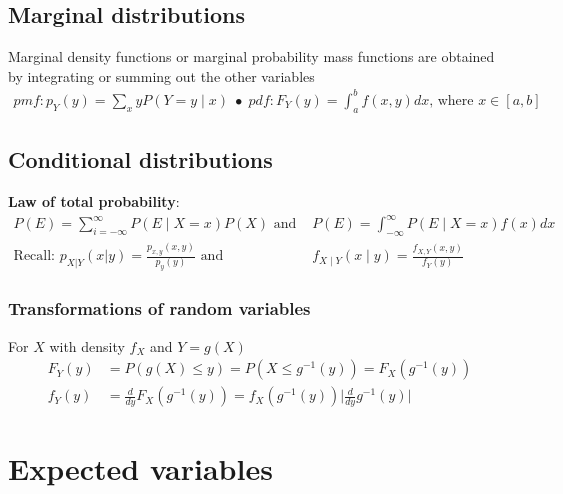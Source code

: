 \documentclass{article}
\newcommand{\abs}[1]{\lvert#1\rvert}
\begin{document}
\subsection{Marginal distributions}
Marginal density functions or marginal probability mass functions are obtained by integrating or summing out the other variables
\begin{align*}
    pmf:  p_Y(y) = \sum_x y P(Y = y \mid x)\; \bullet \; pdf: F_Y(y) = \int_a^b f(x,y)dx \textrm{, where } x \in [a,b]
\end{align*}

\subsection{Conditional distributions}
\textbf{Law of total probability}:
\begin{align*}
    P(E) = \sum_{i=-\infty}^\infty P(E \mid X = x)P(X) \textrm{ and } &P(E) = \int_{-\infty}^\infty P(E \mid X=x)f(x)dx\\
    \textrm{Recall: } p_{X|Y}(x|y) = \frac{p_{x,y}(x,y)}{p_y(y)} \textrm{ and } &f_{X\mid Y}(x \mid y) = \frac{f_{X,Y}(x, y)}{f_Y(y)}
\end{align*}

\subsubsection{Transformations of random variables}
For $X$ with density $f_X$ and $Y = g(X)$
\begin{align*}
    F_Y(y) &= P(g(X)\leq y) = P(X \leq g^{-1}(y)) = F_X(g^{-1}(y))\\
    f_Y(y) &= \frac{d}{dy}F_X(g^{-1}(y)) = f_X(g^{-1}(y))\abs{\frac{d}{dy}g^{-1}(y)}
\end{align*}




\section{Expected variables}
\end{document}
